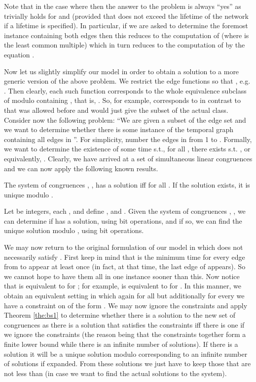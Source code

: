 \documentclass[oribibl, 11pt]{llncs}
\begin{document}
Note that in the case where  then the answer to the problem is always ``yes'' as  trivially holds for  and  (provided that  does not exceed the lifetime of the network if a lifetime is specified). In particular, if we are asked to determine the foremost instance containing both edges then this reduces to the computation of  (where  is the least common multiple) which in turn reduces to the computation of  by the equation . 

Now let us slightly simplify our model in order to obtain a solution to a more generic version of the above problem. We restrict the edge functions  so that , e.g. . Then clearly, each such function corresponds to the whole equivalence subclass of  modulo  containing , that is, . So, for example,  corresponds to  in contrast to  that was allowed before and would just give the subset  of the actual class. Consider now the following problem: ``We are given a subset  of the edge set  and we want to determine whether there is some instance of the temporal graph containing all edges in ''. For simplicity, number the edges in  from 1 to . Formally, we want to determine the existence of some time  s.t., for all , there exists  s.t. , or equivalently, . Clearly, we have arrived at a set of simultaneous linear congruences and we can now apply the following known results.

\begin{theorem}  \label{the:bs1}
The system of congruences , , has a solution iff  for all . If the solution exists, it is unique modulo .
\end{theorem}

\begin{corollary} 
Let  be integers, each , and define , and . Given the system  of congruences , , we can determine if  has a solution, using  bit operations, and if so, we can find the unique solution modulo , using  bit operations.
\end{corollary}

We may now return to the original formulation of our model in which  does not necessarily satisfy . First keep in mind that  is the minimum time for every edge from  to appear at least once (in fact, at that time, the last edge of  appears). So we cannot hope to have them all in one instance sooner than this. Now notice that  is equivalent to  for ; for example,  is equivalent to  for . In this manner, we obtain an equivalent setting in which again  for all  but additionally for every  we have a constraint on  of the form . We may now ignore the constraints and apply Theorem \ref{the:bs1} to determine whether there is a solution to the new set of congruences as there is a solution that satisfies the constraints iff there is one if we ignore the constraints (the reason being that the constraints together form a finite lower bound while there is an infinite number of solutions). If there is a solution it will be a unique solution modulo  corresponding to an infinite number of solutions if expanded. From these solutions we just have to keep those that are not less than  (in case we want to find the actual solutions to the system). 
\end{document}
